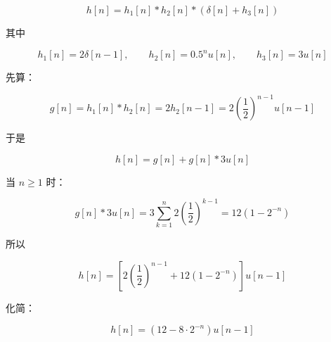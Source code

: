 \documentclass[11pt]{ctexart}
\begin{document}
\[

h[n]=h_1[n]*h_2[n]*(\delta[n]+h_3[n])

\]



其中\par



\[

h_1[n]=2\delta[n-1],\qquad

h_2[n]=0.5^n u[n],\qquad

h_3[n]=3u[n]

\]



先算：\par



\[

g[n]=h_1[n]*h_2[n]

=2h_2[n-1]

=2\left(\frac12\right)^{n-1}u[n-1]

\]



于是\par



\[

h[n]=g[n]+g[n]*3u[n]

\]



当 \(n\ge1\) 时：\par



\[

g[n]*3u[n]

=3\sum_{k=1}^{n}2\left(\frac12\right)^{k-1}

=12(1-2^{-n})

\]



所以\par



\[

h[n]=

\left[

2\left(\frac12\right)^{n-1}

 +12(1-2^{-n})

\right]u[n-1]

\]



化简：\par



\[

h[n]=\left(12-8\cdot2^{-n}\right)u[n-1]

\]
\end{document}

